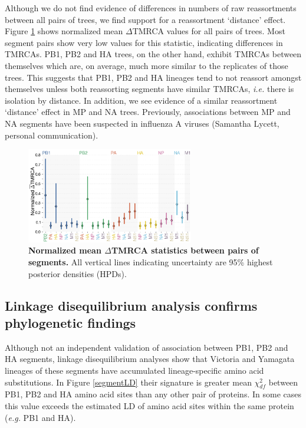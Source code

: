 \documentclass[11pt,oneside,letterpaper]{article}
\begin{document}
Although we do not find evidence of differences in numbers of raw reassortments between all pairs of trees, we find support for a reassortment `distance' effect.
Figure \ref{deltaTMRCA} shows normalized mean $\Delta$TMRCA values for all pairs of trees.
Most segment pairs show very low values for this statistic, indicating differences in TMRCAs.
PB1, PB2 and HA trees, on the other hand, exhibit TMRCAs between themselves which are, on average, much more similar to the replicates of those trees.
This suggests that PB1, PB2 and HA lineages tend to not reassort amongst themselves unless both reassorting segments have similar TMRCAs, \textit{i.e.} there is isolation by distance.
In addition, we see evidence of a similar reassortment `distance' effect in MP and NA trees.
Previously, associations between MP and NA segments have been suspected in influenza A viruses (Samantha Lycett, personal communication).

\begin{figure}[h]
	\centering		
	\includegraphics[width=0.65\textwidth]{figures/InfB_normalizedMuDeltaTMRCA.png}
	\caption{\textbf{Normalized mean $\Delta$TMRCA statistics between pairs of segments.}
All vertical lines indicating uncertainty are 95\% highest posterior densities (HPDs).}
	\label{deltaTMRCA}
\end{figure}

\subsection*{Linkage disequilibrium analysis confirms phylogenetic findings}
Although not an independent validation of association between PB1, PB2 and HA segments, linkage disequilibrium analyses show that Victoria and Yamagata lineages of these segments have accumulated lineage-specific amino acid substitutions.
In Figure \ref{segmentLD} their signature is greater mean $\chi^{2}_{df}$ between PB1, PB2 and HA amino acid sites than any other pair of proteins.
In some cases this value exceeds the estimated LD of amino acid sites within the same protein (\textit{e.g.} PB1 and HA).
\end{document}
